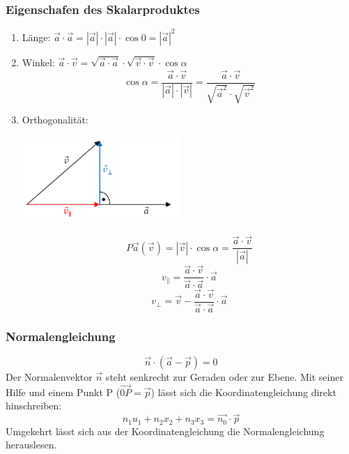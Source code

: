 	\subsubsection{Eigenschafen des Skalarproduktes}
		\begin{enumerate}
			\item Länge: $\vec{a} \cdot \vec{a} = |\vec{a}|\cdot |\vec{a}| \cdot \cos0 = |\vec{a}|^2$
			\item Winkel: $\vec{a} \cdot \vec{v} = \sqrt{\vec{a}\cdot \vec{a}} \cdot \sqrt{\vec{v} \cdot \vec{v}} \cdot \cos\alpha$\\
				\begin{equation*}
					\cos\alpha = \frac{\vec{a}\cdot \vec{v}}{|\vec{a}| \cdot |\vec{v}|} = \frac{\vec{a}\cdot \vec{v}}{\sqrt{\vec{a}^2} \cdot \sqrt{\vec{v}^2}}
				\end{equation*}
			\item Orthogonalität: \\
				\begin{minipage}{6cm}
					\includegraphics[width=6cm]{pics/1_Projektion.png}
				\end{minipage}
				\begin{minipage}[c]{8cm}
					\begin{equation*} P\vec{a}(\vec{v}) = |\vec{v}|\cdot \cos\alpha = \frac{\vec{a}\cdot \vec{v}}{|\vec{a}|}\end{equation*}
					\begin{equation*} v_{\parallel} = \frac{\vec{a}\cdot \vec{v}}{\vec{a}\cdot \vec{a}}\cdot \vec{a}\end{equation*}
					\begin{equation*} v_{\perp} = \vec{v} - \frac{\vec{a}\cdot \vec{v}}{\vec{a}\cdot \vec{a}}\cdot \vec{a}\end{equation*}
				\end{minipage}
		\end{enumerate}

	\subsubsection{Normalengleichung}
		\begin{equation*}
			\vec{n} \cdot (\vec{a} - \vec{p}) = 0
		\end{equation*}
		Der Normalenvektor $\vec{n}$ steht senkrecht zur Geraden oder zur Ebene. Mit seiner Hilfe und einem Punkt P ($\vec{0P} = \vec{p}$) lässt sich
		die Koordinatengleichung direkt hinschreiben:
		\begin{equation*}
			n_1u_1 + n_2x_2 + n_3x_3 = \vec{n_0} \cdot \vec{p}
		\end{equation*}
		Umgekehrt lässt sich aus der Koordinatengleichung die Normalengleichung herauslesen.



